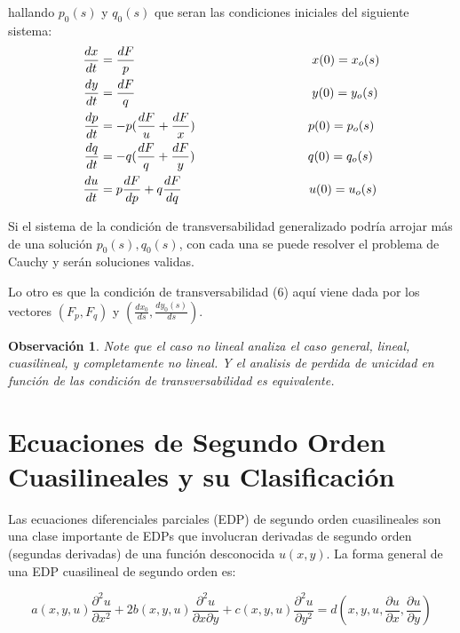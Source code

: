 \documentclass[11pt]{book}
\theoremstyle{plain}
\newtheorem{obs}[proposición]{Observación}
\theoremstyle{definition}
\begin{document}
hallando $p_0(s)$ y $q_0(s)$ que seran las condiciones iniciales del siguiente sistema:
\begin{align}
    \frac{dx}{dt} &= \frac{dF}{p} \hspace{50mm} x(0) = x_o(s)\\
    \frac{dy}{dt} &= \frac{dF}{q} \hspace{50mm} y(0) = y_o(s)\\
    \frac{dp}{dt} &= -p(\frac{dF}{u} + \frac{dF}{x}) \hspace{32mm} p(0) = p_o(s)\\
    \frac{dq}{dt} &= -q(\frac{dF}{q} + \frac{dF}{y}) \hspace{32mm} q(0) = q_o(s)\\
    \frac{du}{dt} &= p\frac{dF}{dp} + q\frac{dF}{dq} \hspace{36mm} u(0) = u_o(s)
\end{align}

Si el sistema de la condición de transversabilidad generalizado podría arrojar más de una solución $p_0(s), q_0(s)$, con cada una se puede resolver el problema de Cauchy y serán soluciones validas.

Lo otro es que la condición de transversabilidad (6) aquí viene dada por los vectores $(F_p,F_q)$ y $(\frac{dx_0}{ds},\frac{dy_0(s)}{ds})$.

\begin{obs}
Note que el caso no lineal analiza el caso general, lineal, cuasilineal, y completamente no lineal. Y el analisis de perdida de unicidad en función de las condición de transversabilidad es equivalente.
\end{obs}

\section{Ecuaciones de Segundo Orden Cuasilineales y su Clasificación}

Las ecuaciones diferenciales parciales (EDP) de segundo orden cuasilineales son una clase importante de EDPs que involucran derivadas de segundo orden (segundas derivadas) de una función desconocida $u(x, y)$. La forma general de una EDP cuasilineal de segundo orden es:

\begin{equation}
a(x, y, u) \frac{\partial^2 u}{\partial x^2} + 2b(x, y, u) \frac{\partial^2 u}{\partial x \partial y} + c(x, y, u) \frac{\partial^2 u}{\partial y^2} = d(x, y, u, \frac{\partial u}{\partial x}, \frac{\partial u}{\partial y})
\end{equation}
\end{document}
